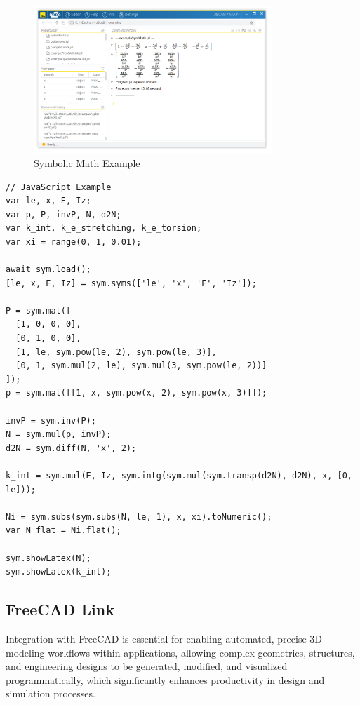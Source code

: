 \documentclass[12pt,a4paper]{article}
\begin{document}
\begin{figure}[H]
    \centering
    \includegraphics[width=0.8\textwidth]{resources/JSLAB_symbolic.png}
    \caption{Symbolic Math Example}
    \label{fig:symbolic-math}
\end{figure}

\begin{lstlisting}[style=JavaScriptStyle]
// JavaScript Example
var le, x, E, Iz;
var p, P, invP, N, d2N;
var k_int, k_e_stretching, k_e_torsion;
var xi = range(0, 1, 0.01);

await sym.load();
[le, x, E, Iz] = sym.syms(['le', 'x', 'E', 'Iz']);

P = sym.mat([
  [1, 0, 0, 0], 
  [0, 1, 0, 0], 
  [1, le, sym.pow(le, 2), sym.pow(le, 3)], 
  [0, 1, sym.mul(2, le), sym.mul(3, sym.pow(le, 2))]
]);
p = sym.mat([[1, x, sym.pow(x, 2), sym.pow(x, 3)]]);

invP = sym.inv(P);
N = sym.mul(p, invP);
d2N = sym.diff(N, 'x', 2);

k_int = sym.mul(E, Iz, sym.intg(sym.mul(sym.transp(d2N), d2N), x, [0, le]));

Ni = sym.subs(sym.subs(N, le, 1), x, xi).toNumeric();
var N_flat = Ni.flat();

sym.showLatex(N);
sym.showLatex(k_int);
\end{lstlisting}

\subsection{FreeCAD Link}
\label{sec:freecad-link}

Integration with FreeCAD is essential for enabling automated, precise 3D modeling workflows within applications, allowing complex geometries, structures, and engineering designs to be generated, modified, and visualized programmatically, which significantly enhances productivity in design and simulation processes.
\end{document}
